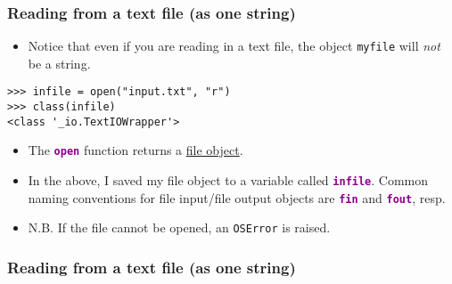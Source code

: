 \documentclass[xcolor=svgnames]{beamer}
\newenvironment{FVerbatim}
 {\VerbatimEnvironment
  \begin{center}
  \begin{lrbox}{\FVerbBox}
  \begin{BVerbatim}}
 {\end{BVerbatim}
  \end{lrbox}
  \fbox{\usebox{\FVerbBox}}
  \end{center}}
\newcommand{\nl}{\\[1em]}
\newcommand{\command}[1]{\texttt{\textbf{\textcolor{DarkMagenta}{#1}}}}
\newcommand{\ft}[1]{\frametitle{#1}}
\begin{document}
\begin{frame}[fragile]\ft{Reading from a text file (as one string)}
\begin{itemize}

\item Notice that even if you are reading in a text file, the object {\tt myfile} will \textit{not} be a string.
\end{itemize}
\begin{Verbatim}[frame=single, xleftmargin=0.5in]
>>> infile = open("input.txt", "r") 
>>> class(infile)
<class '_io.TextIOWrapper'>
\end{Verbatim}
\begin{itemize}
\item The \command{open} function returns a  \href{https://docs.python.org/3/glossary.html#term-file-object}{file object}.\nl
\item In the above, I saved my file object to a variable called \command{infile}.  Common naming conventions for file input/file output objects are \command{fin} and \command{fout}, resp.\nl
\item N.B. If the file cannot be opened, an {\tt OSError} is raised.\nl

\end{itemize}
\end{frame}

\begin{frame}[fragile]\ft{Reading from a text file (as one string)}
\end{frame}
\end{document}
